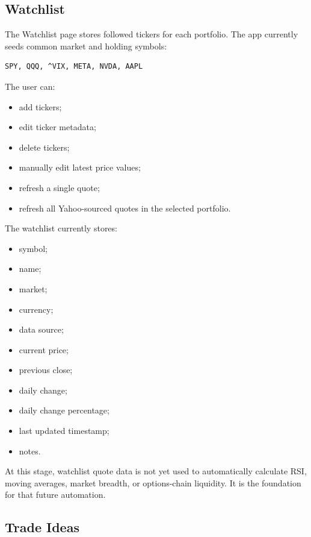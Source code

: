 \documentclass[11pt]{article}
\begin{document}
\subsection{Watchlist}

The Watchlist page stores followed tickers for each portfolio. The app currently seeds common market and holding symbols:

\begin{lstlisting}
SPY, QQQ, ^VIX, META, NVDA, AAPL
\end{lstlisting}

The user can:

\begin{itemize}[noitemsep]
  \item add tickers;
  \item edit ticker metadata;
  \item delete tickers;
  \item manually edit latest price values;
  \item refresh a single quote;
  \item refresh all Yahoo-sourced quotes in the selected portfolio.
\end{itemize}

The watchlist currently stores:

\begin{itemize}[noitemsep]
  \item symbol;
  \item name;
  \item market;
  \item currency;
  \item data source;
  \item current price;
  \item previous close;
  \item daily change;
  \item daily change percentage;
  \item last updated timestamp;
  \item notes.
\end{itemize}

At this stage, watchlist quote data is not yet used to automatically calculate RSI, moving averages, market breadth, or options-chain liquidity. It is the foundation for that future automation.

\subsection{Trade Ideas}
\end{document}
